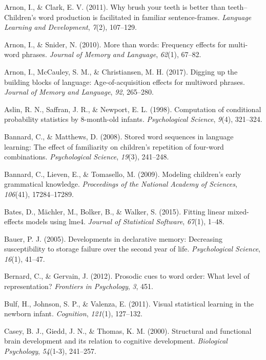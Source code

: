 \documentclass[man,mask,floatsintext]{apa6}
\begin{document}
\hypertarget{ref-arnon2011brush}{}
Arnon, I., \& Clark, E. V. (2011). Why brush your teeth is better than
teeth--Children's word production is facilitated in familiar
sentence-frames. \emph{Language Learning and Development}, \emph{7}(2),
107--129.

\hypertarget{ref-arnon2010more}{}
Arnon, I., \& Snider, N. (2010). More than words: Frequency effects for
multi-word phrases. \emph{Journal of Memory and Language}, \emph{62}(1),
67--82.

\hypertarget{ref-arnon2017}{}
Arnon, I., McCauley, S. M., \& Christiansen, M. H. (2017). Digging up
the building blocks of language: Age-of-acquisition effects for
multiword phrases. \emph{Journal of Memory and Language}, \emph{92},
265--280.

\hypertarget{ref-aslin1998computation}{}
Aslin, R. N., Saffran, J. R., \& Newport, E. L. (1998). Computation of
conditional probability statistics by 8-month-old infants.
\emph{Psychological Science}, \emph{9}(4), 321--324.

\hypertarget{ref-bannard2008stored}{}
Bannard, C., \& Matthews, D. (2008). Stored word sequences in language
learning: The effect of familiarity on children's repetition of
four-word combinations. \emph{Psychological Science}, \emph{19}(3),
241--248.

\hypertarget{ref-bannard2009modeling}{}
Bannard, C., Lieven, E., \& Tomasello, M. (2009). Modeling children's
early grammatical knowledge. \emph{Proceedings of the National Academy
of Sciences}, \emph{106}(41), 17284--17289.

\hypertarget{ref-lme4}{}
Bates, D., Mächler, M., Bolker, B., \& Walker, S. (2015). Fitting linear
mixed-effects models using lme4. \emph{Journal of Statistical Software},
\emph{67}(1), 1--48.

\hypertarget{ref-bauer2005developments}{}
Bauer, P. J. (2005). Developments in declarative memory: Decreasing
susceptibility to storage failure over the second year of life.
\emph{Psychological Science}, \emph{16}(1), 41--47.

\hypertarget{ref-bernard2012prosodic}{}
Bernard, C., \& Gervain, J. (2012). Prosodic cues to word order: What
level of representation? \emph{Frontiers in Psychology}, \emph{3}, 451.

\hypertarget{ref-bulf2011visual}{}
Bulf, H., Johnson, S. P., \& Valenza, E. (2011). Visual statistical
learning in the newborn infant. \emph{Cognition}, \emph{121}(1),
127--132.

\hypertarget{ref-casey2000structural}{}
Casey, B. J., Giedd, J. N., \& Thomas, K. M. (2000). Structural and
functional brain development and its relation to cognitive development.
\emph{Biological Psychology}, \emph{54}(1-3), 241--257.
\end{document}
